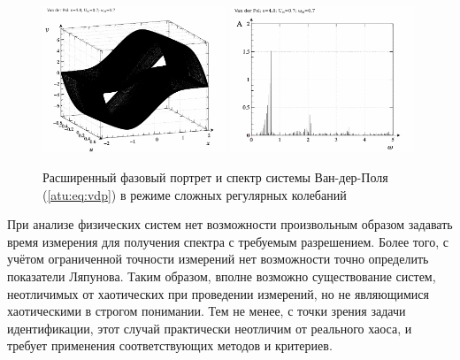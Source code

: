 \begin{figure}[ht!]
\begin{center}
  \includegraphics[width=0.49\textwidth]{p/cha/vdp/vdp_0-p_ph2d_4x80_0x70_0x70.png}
  \hfill
  \includegraphics[width=0.49\textwidth]{p/cha/vdp/vdp_fft-p_f_4x80_0x70_0x70.png}
\end{center}
  \caption{Расширенный фазовый портрет и спектр системы Ван-дер-Поля (\ref{atu:eq:vdp}) в режиме сложных регулярных колебаний}
\label{atu:f:vdp_phase_f_complex}
\end{figure}



При анализе физических систем нет возможности произвольным образом
задавать время измерения для получения спектра с требуемым разрешением.
Более того, с учётом ограниченной точности измерений нет возможности
точно определить показатели Ляпунова. Таким образом,
вполне возможно существование систем, неотличимых от хаотических
при проведении измерений, но не являющимися хаотическими в строгом понимании.
Тем не менее, с точки зрения задачи идентификации,
этот случай практически неотличим от реального хаоса, и требует
применения соответствующих методов и критериев.



